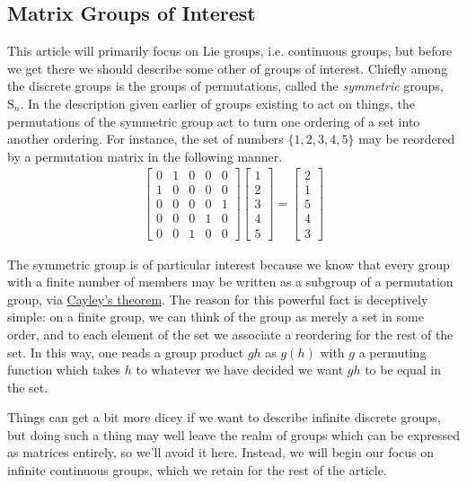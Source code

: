 \documentclass[11pt]{article}
\begin{document}
\subsection{Matrix Groups of Interest}

This article will primarily focus on Lie groups, i.e. continuous groups, but before we get there we should describe some other of groups of interest. Chiefly among the discrete groups is the groups of permutations, called the \emph{symmetric} groups, $\mathrm{S}_n$. In the description given earlier of groups existing to act on things, the permutations of the symmetric group act to turn one ordering of a set into another ordering. For instance, the set of numbers $\{1,2,3,4,5\}$ may be reordered by a permutation matrix in the following manner. \begin{gather*}
\begin{bmatrix}
0&1&0&0&0 \\ 1&0&0&0&0 \\ 0&0&0&0&1 \\ 0&0&0&1&0 \\ 0&0&1&0&0
\end{bmatrix} \begin{bmatrix}
1\\2\\3\\4\\5
\end{bmatrix} = 
\begin{bmatrix}
2\\1\\5\\4\\3
\end{bmatrix}
\end{gather*}

The symmetric group is of particular interest because we know that every group with a finite number of members may be written as a subgroup of a permutation group, via \hyperlink{https://en.wikipedia.org/wiki/Cayley\%27s\_theorem}{Cayley's theorem}. The reason for this powerful fact is deceptively simple: on a finite group, we can think of the group as merely a set in some order, and to each element of the set we associate a reordering for the rest of the set. In this way, one reads a group product $gh$ as $g(h)$ with $g$ a permuting function which takes $h$ to whatever we have decided we want $gh$ to be equal in the set.

Things can get a bit more dicey if we want to describe infinite discrete groups, but doing such a thing may well leave the realm of groups which can be expressed as matrices entirely, so we'll avoid it here. Instead, we will begin our focus on infinite continuous groups, which we retain for the rest of the article. 
\end{document}
